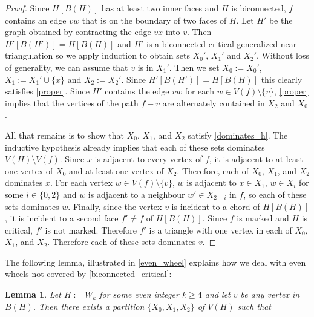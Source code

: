 \documentclass{article}
\newtheorem{lem}{Lemma}
\theoremstyle{definition}
\begin{document}
\begin{proof}
  Since $H[B(H)]$ has at least two inner faces and $H$ is biconnected, $f$ contains an edge $vw$ that is on the boundary of two faces of $H$.  Let $H'$ be the graph obtained by contracting the edge $vx$ into $v$. Then $H'[B(H')]=H[B(H)]$ and $H'$ is a biconnected critical generalized near-triangulation so we apply induction to obtain sets $X_0'$, $X_1'$ and $X_2'$.  Without loss of generality, we can assume that $v$ is in $X_1'$.  Then we set $X_0:=X_0'$, $X_1:=X_1'\cup\{x\}$ and $X_2:=X_2'$. Since $H'[B(H')]=H[B(H)]$ this clearly satisfies \cref{proper}.  Since $H'$ contains the edge $vw$ for each $w\in V(f)\setminus\{v\}$, \cref{proper} implies that the vertices of the path $f-v$ are alternately contained in $X_2$ and $X_0$.

  All that remains is to show that $X_0$, $X_1$, and $X_2$ satisfy \cref{dominates_h}.  The inductive hypothesis already implies that each of these sets dominates $V(H)\setminus V(f)$.  Since $x$ is adjacent to every vertex of $f$, it is adjacent to at least one vertex of $X_0$ and at least one vertex of $X_2$.  Therefore, each of $X_0$, $X_1$, and $X_2$ dominates $x$.  For each vertex $w\in V(f)\setminus\{v\}$, $w$ is adjacent to $x\in X_1$, $w\in X_{i}$ for some $i\in\{0,2\}$ and $w$ is adjacent to a neighbour $w'\in X_{2-i}$ in $f$, so each of these sets dominates $w$.  Finally, since the vertex $v$ is incident to a chord of $H[B(H)]$, it is incident to a second face $f'\neq f$ of $H[B(H)]$.  Since $f$ is marked and $H$ is critical, $f'$ is not marked.  Therefore $f'$ is a triangle with one vertex in each of $X_0$, $X_1$, and $X_2$. Therefore each of these sets dominates $v$.
\end{proof}

The following lemma, illustrated in \cref{even_wheel}
 explains how we deal with even wheels not covered by \cref{biconnected_critical}:

\begin{lem}\label{wheelie}
  Let $H:=W_k$ for some even integer $k\ge 4$ and let $v$ be any vertex in $B(H)$.  Then there exists a partition $\{X_0,X_1,X_2\}$ of $V(H)$ such that
\end{lem}
\end{document}
